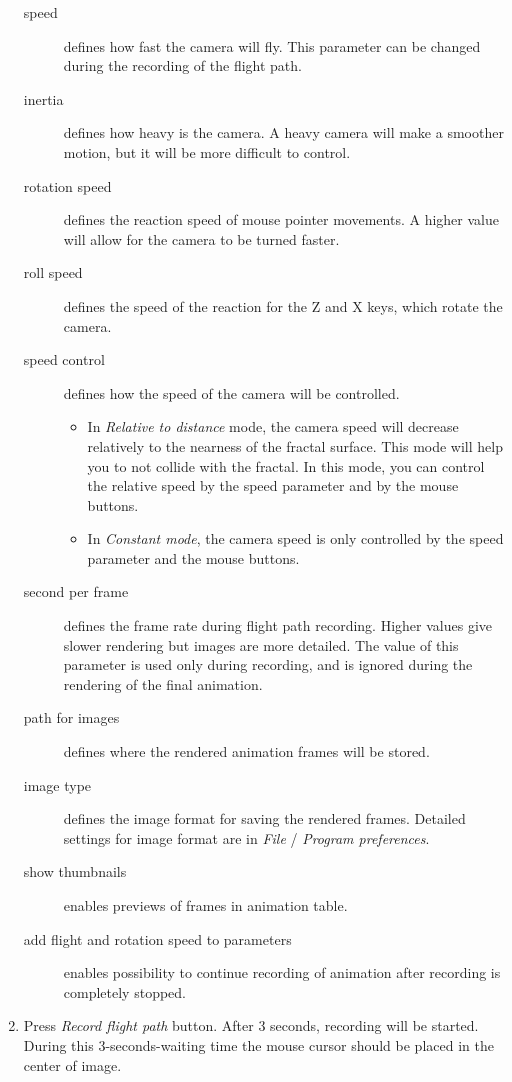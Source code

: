 \begin{enumerate}
	\begin{description}
		\item[speed] defines how fast the camera will fly. This parameter can be changed during the recording of the flight path.
		\item[inertia] defines how heavy is the camera. A heavy camera will make a smoother motion, but it will be more difficult to control.
		\item[rotation speed] defines the reaction  speed of mouse pointer movements. A higher value will allow for the camera to be turned faster.
		\item[roll speed] defines the speed of the reaction for the Z and X keys, which rotate the camera.
		\item[speed control] defines how the speed of the camera will be controlled.
		\begin{itemize} 
			\item In \emph{Relative to distance} mode, the camera speed will decrease relatively to the nearness of the fractal surface. This mode will help you to not collide with the fractal. In this mode, you can control the relative speed by the speed parameter and by the mouse buttons.
			\item In \emph{Constant mode}, the camera speed is only controlled by the speed parameter and the mouse buttons.
		\end{itemize}
		\item[second per frame] defines the frame rate during flight path recording. Higher values give slower rendering but images are more detailed. The value of this parameter is used only during recording, and is ignored during the rendering of the final animation.
		\item[path for images] defines where the rendered animation frames will be stored.
		\item[image type] defines the image format for saving the rendered frames. Detailed settings for image format are in \emph{File} / \emph{Program preferences}.
		\item[show thumbnails] enables previews of frames in animation table.
		\item[add flight and rotation speed to parameters] enables possibility to continue recording of animation after recording is completely stopped. 
	\end{description}

	\item Press \emph{Record flight path} button. After 3 seconds, recording will be started. During this 3-seconds-waiting time the mouse cursor should be placed in the center of image.
	

\end{enumerate}
